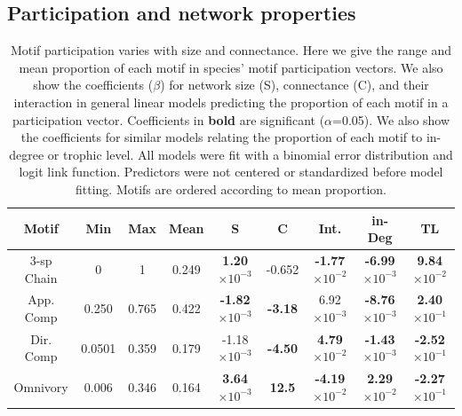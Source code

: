 \documentclass[12pt]{article}
\begin{document}
\begin{spacing}{2.0}
\subsection{Participation and network properties} 

    \begin{table}[hb!]
        \centering
        \caption{Motif participation varies with size and connectance. Here we give the range and mean proportion of each motif in species' motif participation vectors. 
        We also show the coefficients ($\beta$) for network size (S), connectance (C), and their interaction in general linear models predicting the proportion of each motif in a participation vector.
        Coefficients in \textbf{bold} are significant ($\alpha$=0.05).
        We also show the coefficients for similar models relating the proportion of each motif to in-degree or trophic level.
        All models were fit with a binomial error distribution and logit link function.
        Predictors were not centered or standardized before model fitting. Motifs are ordered according to mean proportion.}
        \label{tab:partic_vs_SC}   
        \footnotesize
        \begin{tabular}{c|c c c | c c c | c | c}
            Motif & Min & Max & Mean & S & C & Int. & in-Deg & TL \\
            \hline
            3-sp Chain & 0 & 1 & 0.249 & \textbf{1.20$\times10^{-3}$} &  -0.652 & \textbf{-1.77$\times10^{-2}$} & \textbf{-6.99$\times10^{-3}$} & \textbf{9.84$\times10^{-2}$} \\
            App. Comp & 0.250 & 0.765 & 0.422 & \textbf{-1.82$\times10^{-3}$} & \textbf{-3.18} & 6.92$\times10^{-3}$ & \textbf{-8.76$\times10^{-3}$} & \textbf{2.40$\times10^{-1}$}\\
            Dir. Comp & 0.0501 & 0.359 & 0.179 & -1.18$\times10^{-3}$ & \textbf{-4.50} & \textbf{4.79$\times10^{-2}$} & \textbf{-1.43$\times10^{-3}$} & \textbf{-2.52$\times10^{-1}$} \\
            Omnivory & 0.006 & 0.346 & 0.164 & \textbf{3.64$\times10^{-3}$} & \textbf{12.5} & \textbf{-4.19$\times10^{-2}$} & \textbf{2.29$\times10^{-2}$} & \textbf{-2.27$\times10^{-1}$}\\   
            \hline
            \end{tabular}
            \end{table}




\end{spacing}
\end{document}
